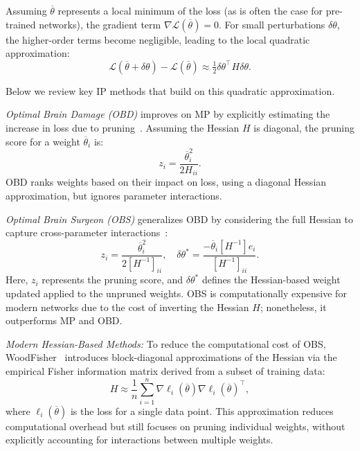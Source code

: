 Assuming $\overline{\theta}$ represents a local minimum of the loss (as is often the case for pre-trained networks), the gradient term $\nabla \mathcal{L}(\overline{\theta}) = 0$. For small perturbations $\delta\theta$, the higher-order terms become negligible, leading to the local quadratic approximation:
\begin{equation}
\mathcal{L}(\overline{\theta} + \delta\theta)-\mathcal{L}(\overline{\theta}) \approx \tfrac{1}{2}\delta\theta^\top H \delta\theta.
\label{eq:quadratic_approximation}
\end{equation}


Below we review key IP methods that build on this quadratic approximation.


\textit{Optimal Brain Damage (OBD)} improves on MP by explicitly estimating the increase in loss due to pruning~\cite{brain_damage}. Assuming the Hessian $H$ is diagonal, the pruning score for a weight $\overline{\theta}_i$ is:
\begin{equation}
z_i = \frac{\overline{\theta}_i^2}{2H_{ii}}.
\label{eq:obd_score}
\end{equation}
OBD ranks weights based on their impact on loss, using a diagonal Hessian approximation, but ignores parameter interactions.

\textit{Optimal Brain Surgeon (OBS)} generalizes OBD by considering the full Hessian to capture cross-parameter interactions~\cite{brain_surgeon}: %
\begin{equation}
z_i = \frac{\overline{\theta}_i^2}{2[H^{-1}]_{ii}}, \quad 
\delta\theta^{*} = \frac{-\overline{\theta}_i [H^{-1}] e_i}{[H^{-1}]_{ii}}.
\label{eq:obs_score_update}
\end{equation}
Here, $z_i$ represents the pruning score, and $\delta\theta^{*}$ defines the Hessian-based weight updated applied to the unpruned weights. OBS is computationally expensive for modern networks due to the cost of inverting the Hessian $H$; nonetheless, it outperforms MP and OBD.


\textit{Modern Hessian-Based Methods:}  
To reduce the computational cost of OBS, WoodFisher~\cite{WoodFisher} introduces block-diagonal approximations of the Hessian via the empirical Fisher information matrix derived from a subset of training data:
\begin{equation}
H \approx \frac{1}{n}\sum_{i=1}^n \nabla \ell_i(\overline{\theta})\nabla \ell_i(\overline{\theta})^\top,
\label{eq:fisher_approximation}
\end{equation}
where $\ell_i(\overline{\theta})$ is the loss for a single data point. This approximation reduces computational overhead but still focuses on pruning individual weights, without explicitly accounting for interactions between multiple weights.



